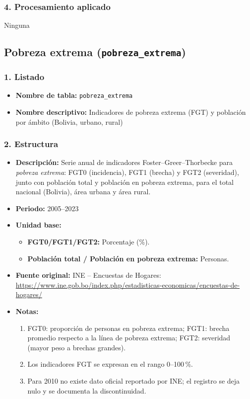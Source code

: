 \documentclass[12pt,a4paper]{article}
\begin{document}
\subsubsection*{4. Procesamiento aplicado}
Ninguna

\subsection{Pobreza extrema \small(\texttt{pobreza\_extrema})}

\subsubsection*{1. Listado}
\begin{itemize}
  \item \textbf{Nombre de tabla:} \texttt{pobreza\_extrema}
  \item \textbf{Nombre descriptivo:} Indicadores de pobreza extrema (FGT) y población por ámbito (Bolivia, urbano, rural)
\end{itemize}

\subsubsection*{2. Estructura}
\begin{itemize}
  \item \textbf{Descripción:} Serie anual de indicadores Foster--Greer--Thorbecke para \emph{pobreza extrema}: FGT0 (incidencia), FGT1 (brecha) y FGT2 (severidad), junto con población total y población en pobreza extrema, para el total nacional (Bolivia), área urbana y área rural.
  \item \textbf{Periodo:} 2005--2023 
  \item \textbf{Unidad base:}
    \begin{itemize}
      \item \textbf{FGT0/FGT1/FGT2:} Porcentaje (\%).
      \item \textbf{Población total / Población en pobreza extrema:} Personas.
    \end{itemize}
  \item \textbf{Fuente original:} INE -- Encuestas de Hogares:\; \url{https://www.ine.gob.bo/index.php/estadisticas-economicas/encuestas-de-hogares/}
  \item \textbf{Notas:}
    \begin{enumerate}
      \item FGT0: proporción de personas en pobreza extrema; FGT1: brecha promedio respecto a la línea de pobreza extrema; FGT2: severidad (mayor peso a brechas grandes).
      \item Los indicadores FGT se expresan en el rango 0--100\,\%.
      \item Para 2010 no existe dato oficial reportado por INE; el registro se deja nulo y se documenta la discontinuidad.
    \end{enumerate}
\end{itemize}
\end{document}
